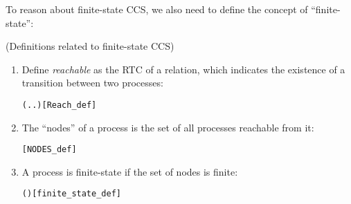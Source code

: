 
To reason about finite-state CCS, we also need to define the concept
of ``finite-state'':
\begin{definition}{(Definitions related to finite-state CCS)}
\begin{enumerate}
\item Define \emph{reachable} as the RTC of a relation, which
  indicates the existence of a transition between two processes:
\begin{alltt}
 \HOLSymConst{\HOLTokenDefEquality{}} (\HOLTokenLambda{} . \HOLSymConst{\HOLTokenExists{}}.  \HOLTokenTransBegin{}\HOLTokenTransEnd {})\HOLSymConst{\HOLTokenSupStar{}}\hfill[Reach_def]
\end{alltt}
\item The ``nodes'' of a process is the set of all processes reachable
  from it:
\begin{alltt}
  \HOLSymConst{\HOLTokenDefEquality{}} \HOLTokenLeftbrace{} \HOLTokenBar{}   \HOLTokenRightbrace{}\hfill[NODES_def]
\end{alltt}
\item A process is finite-state if the set of nodes is finite:
\begin{alltt}
  \HOLSymConst{\HOLTokenDefEquality{}}  ( )\hfill[finite_state_def]
\end{alltt}
\end{enumerate}
\end{definition}

